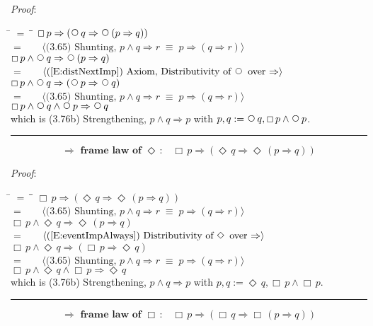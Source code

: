 \documentclass[12pt, fleqn, leqno]{article}
\newcommand{\lgap}{2pt}                             %
\newcommand{\mymathindent}{24pt}                    %
\newcommand{\equivs}{\ensuremath{\;\equiv\;}}       %
\newcommand{\impl}{\ensuremath{\Rightarrow}}        %
\newcommand{\Next}{\;\,\text{\raisebox{3.5pt}{\circle{6}}}}
\newcommand{\Event}{\Diamond\,}
\newcommand{\Always}{\Box\,}
\newcommand{\myqed}{\rule[-.23ex]{1.2ex}{2.0ex}}
\newcommand{\myqedtab}{\hspace{384pt}}              %
\newcommand{\Gll} {\langle}                         %
\newcommand{\Ggg} {\rangle}                         %
\newcommand{\Hint}[1]     {\ \ \ $\Gll              \mbox{#1} \Ggg$ }   %
\begin{document}
\emph{Proof}: 
\begin{tabbing}
\hspace{\mymathindent} \= $= \;$ \= \myqedtab \= \kill
  \> \>   $\Always p \impl (\Next q \impl \Next (p \impl q))$\\[\lgap]
  \> $=$  \>  \Hint{(3.65) Shunting, $p\land q\impl r\equivs p\impl (q\impl r)$}\\[\lgap]
  \> \>   $\Always p \land \Next q \impl \Next (p \impl q)$\\[\lgap]
  \> $=$  \>  \Hint{(\ref{E:distNextImp}) Axiom, Distributivity of $\Next$ over $\impl$}\\[\lgap]
  \> \>   $\Always p \land \Next q \impl  (\Next p \impl \Next q)$\\[\lgap]
   \> $=$  \>  \Hint{(3.65) Shunting, $p\land q\impl r\equivs p\impl (q\impl r)$}\\[\lgap]
  \> \>   $\Always p \land \Next q  \land \Next p \impl \Next q$\\[\lgap]
   \> which is (3.76b) Strengthening, $p\land q \impl p$ with $p, q :=\Next q ,\Always p \land \Next p$. \quad \myqed
\end{tabbing}
\begin{equation}\label{E:implframelawEvent}
\textbf{$\impl$ frame law of $\Event$:}\quad \Always p \impl (\Event q \impl \Event (p \impl q))
\end{equation}

\emph{Proof}: 
\begin{tabbing}
\hspace{\mymathindent} \= $= \;$ \= \myqedtab \= \kill
  \> \>   $\Always p \impl (\Event q \impl \Event (p \impl q))$\\[\lgap]
  \> $=$  \>  \Hint{(3.65) Shunting, $p\land q\impl r\equivs p\impl (q\impl r)$}\\[\lgap]
  \> \>   $\Always p \land \Event q \impl \Event (p \impl q)$\\[\lgap]
  \> $=$  \>  \Hint{(\ref{E:eventImpAlways}) Distributivity of $\Event$ over $\impl$}\\[\lgap]
  \> \>   $\Always p \land \Event q \impl  (\Always p \impl \Event q)$\\[\lgap]
   \> $=$  \>  \Hint{(3.65) Shunting, $p\land q\impl r\equivs p\impl (q\impl r)$}\\[\lgap]
  \> \>   $\Always p \land \Event q  \land \Always p \impl \Event q$\\[\lgap]
   \> which is (3.76b) Strengthening, $p\land q \impl p$ with $p, q :=\Event q ,\Always p \land \Always p$. \quad \myqed
\end{tabbing}
\begin{equation}\label{E:implframelawAlways}
\textbf{$\impl$ frame law of $\Always$:}\quad \Always p \impl (\Always q \impl \Always (p \impl q))
\end{equation}
\end{document}
